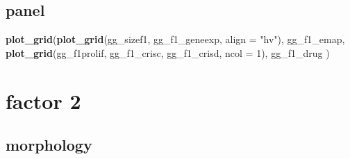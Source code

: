 \documentclass[
]{article}
\newenvironment{Shaded}{\begin{snugshade}}{\end{snugshade}}
\newcommand{\DataTypeTok}[1]{\textcolor[rgb]{0.13,0.29,0.53}{#1}}
\newcommand{\DecValTok}[1]{\textcolor[rgb]{0.00,0.00,0.81}{#1}}
\newcommand{\KeywordTok}[1]{\textcolor[rgb]{0.13,0.29,0.53}{\textbf{#1}}}
\newcommand{\NormalTok}[1]{#1}
\newcommand{\StringTok}[1]{\textcolor[rgb]{0.31,0.60,0.02}{#1}}
\begin{document}
\hypertarget{panel}{%
\subsection{panel}\label{panel}}

\begin{Shaded}
\begin{Highlighting}[]
\KeywordTok{plot_grid}\NormalTok{(}\KeywordTok{plot_grid}\NormalTok{(gg_sizef1, gg_f1_geneexp, }\DataTypeTok{align =} \StringTok{"hv"}\NormalTok{), }
\NormalTok{          gg_f1_emap,}
          \KeywordTok{plot_grid}\NormalTok{(gg_f1prolif, gg_f1_crisc, gg_f1_crisd, }\DataTypeTok{ncol =} \DecValTok{1}\NormalTok{),}
\NormalTok{          gg_f1_drug}
\NormalTok{          )}
\end{Highlighting}
\end{Shaded}

\hypertarget{factor-2}{%
\section{factor 2}\label{factor-2}}

\hypertarget{morphology}{%
\subsection{morphology}\label{morphology}}
\end{document}
